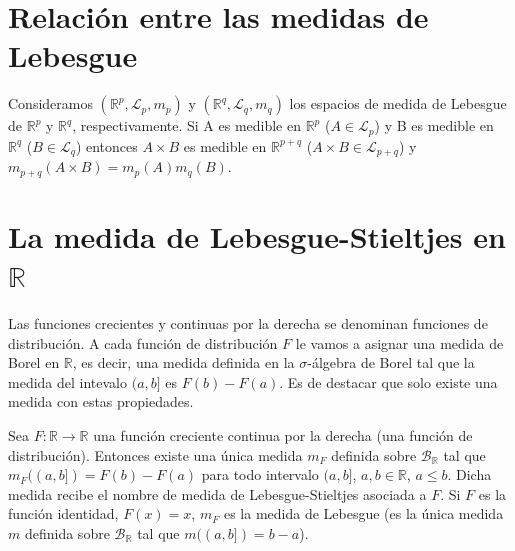 \section{Relación entre las medidas de Lebesgue}

\begin{teo}
    Consideramos $(\mathbb{R}^p, \mathcal{L}_p, m_p)$ y $(\mathbb{R}^q, \mathcal{L}_q, m_q)$ los espacios de medida de Lebesgue de $\mathbb{R}^p$ y $\mathbb{R}^q$, respectivamente. Si A es medible en $\mathbb{R}^p$ ($A \in \mathcal{L}_p$) y B es medible en $\mathbb{R}^q$ ($B \in \mathcal{L}_q$) entonces $A \times B$ es medible en $\mathbb{R}^{p + q}$ ($A \times B \in \mathcal{L}_{p + q}$) y $m_{p + q}(A \times B) = m_p(A)m_q(B)$.
\end{teo}

\section{La medida de Lebesgue-Stieltjes en $\mathbb{R}$}

Las funciones crecientes y continuas por la derecha se denominan funciones de distribución. A cada función de distribución $F$ le vamos a asignar una medida de Borel en $\mathbb{R}$, es decir, una medida definida en la $\sigma$-álgebra de Borel tal que la medida del intevalo $(a,b]$ es $F(b) - F(a)$. Es de destacar que solo existe una medida con estas propiedades.

\begin{teo}
    Sea $F: \mathbb{R} \longrightarrow \mathbb{R}$ una función creciente continua por la derecha (una función de distribución). Entonces existe una única medida $m_F$ definida sobre $\mathcal{B}_{\mathbb{R}}$ tal que $m_F((a,b]) = F(b) - F(a)$ para todo intervalo $(a,b]$, $a,b \in \mathbb{R}$, $a \leq b$. Dicha medida recibe el nombre de medida de Lebesgue-Stieltjes asociada a $F$. Si $F$ es la función identidad, $F(x) = x$, $m_F$ es la medida de Lebesgue (es la única medida $m$ definida sobre $\mathcal{B}_{\mathbb{R}}$ tal que $m((a,b]) = b - a$).
\end{teo}

